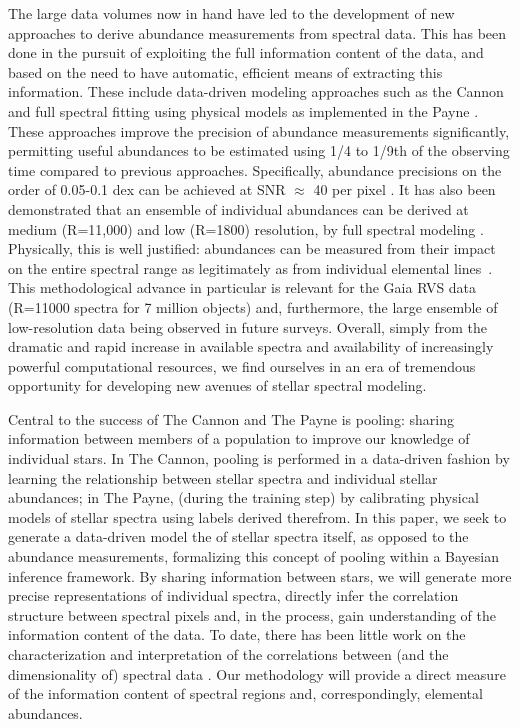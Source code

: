 \documentclass[a4paper,fleqn,usenatbib]{mnras}
\begin{document}
The large data volumes now in hand have led to the development of new approaches to derive abundance measurements from spectral data. This has been done in the pursuit of exploiting the full information content of the data, and based on the need to have automatic, efficient means of extracting this information. These include data-driven modeling approaches such as the Cannon \citep{Ness2015} and full spectral fitting using physical models as implemented in the Payne \citep{Ting2018}. These approaches improve the precision of abundance measurements significantly, permitting useful abundances to be estimated using 1/4 to 1/9th of the observing time compared to previous approaches. Specifically, abundance precisions on the order of 0.05-0.1 dex can be achieved at SNR $\approx$ 40 per pixel \citep{Ness2018,Ting2018,Ho2017b}. It has also been demonstrated that an ensemble of individual abundances can be derived at medium (R=11,000) and low (R=1800) resolution, by full spectral modeling \citep[e.g.][and Wheeler et al., in prep]{Casey2016, Ting2017}. Physically, this is well justified: abundances can be measured from their impact on the entire spectral range as legitimately as from individual elemental lines~\citep[e.g.][]{Ting2018}. This methodological advance in particular is relevant for the Gaia RVS data (R=11000 spectra for 7 million objects) and, furthermore, the large ensemble of low-resolution data being observed in future surveys. Overall, simply from the dramatic and rapid increase in available spectra and availability of increasingly powerful computational resources, we find ourselves in an era of tremendous opportunity for developing new avenues of stellar spectral modeling.

Central to the success of The Cannon and The Payne is pooling: sharing information between members of a population to improve our knowledge of individual stars. In The Cannon, pooling is performed in a data-driven fashion by learning the relationship between stellar spectra and individual stellar abundances; in The Payne, (during the training step) by calibrating physical models of stellar spectra using labels derived therefrom. In this paper, we seek to generate a data-driven model the of stellar spectra itself, as opposed to the abundance measurements, formalizing this concept of pooling within a Bayesian inference framework. By sharing information between stars, we will generate more precise representations of individual spectra, directly infer the correlation structure between spectral pixels and, in the process, gain understanding of the information content of the data. To date, there has been little work on the characterization and interpretation of the correlations between (and the dimensionality of) spectral data \citep[see however][]{Ting2012, PJ2019, M2014}. Our methodology will provide a direct measure of the information content of spectral regions and, correspondingly, elemental abundances.
\end{document}
